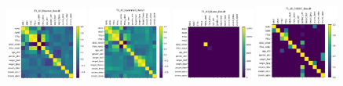 \begin{figure}
    \centering
    \includegraphics[width=0.24\textwidth]{diss/7_cond/figs/T1_All_Pearson_Result.png}
    \includegraphics[width=0.24\textwidth]{diss/7_cond/figs/T1_All_Spearman_Result.png}
    \includegraphics[width=0.24\textwidth]{diss/7_cond/figs/T1_All_Glasso_Result.png}
    \includegraphics[width=0.24\textwidth]{diss/7_cond/figs/T1_All_CODEC_Result.png}
    

\end{figure}
